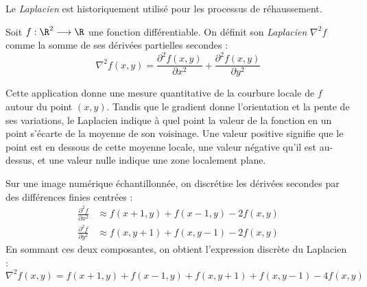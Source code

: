 Le \emph{Laplacien} est historiquement utilisé pour les processus de réhaussement.

\begin{definition}
    Soit $f : \R^2 \longrightarrow \R$ une fonction différentiable. On définit son \emph{Laplacien} $\nabla^2 f$ comme la somme de ses dérivées partielles secondes :
    \begin{equation}
        \nabla^2 f(x,y) = \frac{\partial^2 f(x,y)}{\partial x^2} + \frac{\partial^2 f(x,y)}{\partial y^2}
    \end{equation}
\end{definition}

Cette application donne une mesure quantitative de la courbure locale de $f$ autour du point $(x,y)$. Tandis que le gradient donne l'orientation et la pente de ses variations, le Laplacien indique à quel point la valeur de la fonction en un point s'écarte de la moyenne de son voisinage. Une valeur positive signifie que le point est en dessous de cette moyenne locale, une valeur négative qu'il est au-dessus, et une valeur nulle indique une zone localement plane.

Sur une image numérique échantillonnée, on discrétise les dérivées secondes par des différences finies centrées :
\begin{align}
    \frac{\partial^2 f}{\partial x^2} &\approx f(x+1, y) + f(x-1, y) - 2f(x,y) \\
    \frac{\partial^2 f}{\partial y^2} &\approx f(x, y+1) + f(x, y-1) - 2f(x,y)
\end{align}
En sommant ces deux composantes, on obtient l'expression discrète du Laplacien :
\begin{equation}
    \nabla^2 f(x,y) = f(x+1, y) + f(x-1, y) + f(x, y+1) + f(x, y-1) - 4 f(x,y)
\end{equation}

